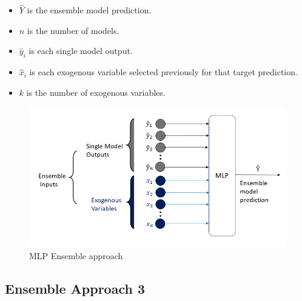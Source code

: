 \begin{itemize}
    \item \begin{math}\hat{Y}\end{math} is the ensemble model prediction.
    \item \begin{math}n\end{math} is the number of models.
    \item \begin{math}\hat{y}_i\end{math} is each single model output.
    \item \begin{math}\hat{x}_i\end{math} is each exogenous variable selected previously for that target prediction.
    \item \begin{math}k\end{math} is the number of exogenous variables.
\end{itemize}

\begin{figure}[h]
\centering
\includegraphics[width=\linewidth]{figures/Ch4/Ensemble_Approach2.png}
\caption{MLP Ensemble approach}
\label{f:Ensemble-approach2}
\end{figure}

\subsection{Ensemble Approach 3}
\label{s:Ensemble-Approach3}

